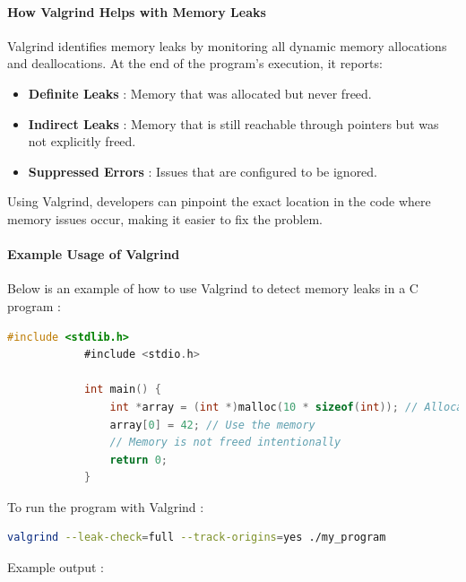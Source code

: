 \documentclass[12pt]{article}
\begin{document}
            \paragraph{How Valgrind Helps with Memory Leaks}
            Valgrind identifies memory leaks by monitoring all dynamic memory allocations and deallocations. At the end of the program's execution, it reports:
            \begin{itemize}
                \item \textbf{Definite Leaks} : Memory that was allocated but never freed.
                \item \textbf{Indirect Leaks} : Memory that is still reachable through pointers but was not explicitly freed.
                \item \textbf{Suppressed Errors} : Issues that are configured to be ignored.
            \end{itemize}
            
            Using Valgrind, developers can pinpoint the exact location in the code where memory issues occur, making it easier to fix the problem.
            
            \paragraph{Example Usage of Valgrind}
            Below is an example of how to use Valgrind to detect memory leaks in a C program :
            
            \begin{lstlisting}[language=C]
            #include <stdlib.h>
            #include <stdio.h>
            
            int main() {
                int *array = (int *)malloc(10 * sizeof(int)); // Allocate memory
                array[0] = 42; // Use the memory
                // Memory is not freed intentionally
                return 0;
            }
            \end{lstlisting}
            \vspace*{2cm}
            To run the program with Valgrind :
            
            \begin{lstlisting}[language=bash]
            valgrind --leak-check=full --track-origins=yes ./my_program
            \end{lstlisting}
            \vspace*{2cm}
            Example output :
            
\end{document}
